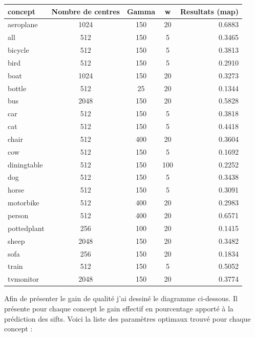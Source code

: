 \documentclass[a4paper, 11pt]{article}
\begin{document}
\begin{center}
\begin{tabular}{|l|c|c|c|r|}
  \hline
  concept & Nombre de centres & Gamma & w & Resultats (map) \\
  \hline
	aeroplane&1024&150 & 20 & 0.6883\\  \hline
	all&512&150 & 5 & 0.3465\\  \hline
	bicycle&512&150 & 5 & 0.3813\\  \hline
	bird&512&150 & 5 & 0.2910\\  \hline
	boat&1024&150 & 20 & 0.3273\\  \hline
	bottle&512&25 & 20 & 0.1344\\  \hline
	bus&2048&150 & 20 & 0.5828\\  \hline
	car&512&150 & 5 & 0.3818\\  \hline
	cat&512&150 & 5 & 0.4418\\  \hline
	chair&512&400 & 20 & 0.3604\\  \hline
	cow&512&150 & 5 & 0.1692\\  \hline
	diningtable&512&150 & 100 & 0.2252\\  \hline
	dog&512&150 & 5 & 0.3438\\  \hline
	horse&512&150 & 5 & 0.3091\\  \hline
	motorbike&512&400 & 20 & 0.2983\\  \hline
	person&512&400 & 20 & 0.6571\\  \hline
	pottedplant&256&100 & 20 & 0.1415\\  \hline
	sheep&2048&150 & 20 & 0.3482\\  \hline
	sofa&256&150 & 20 & 0.1834\\  \hline
	train&512&150 & 5 & 0.5052\\  \hline
	tvmonitor&2048&150 & 20 & 0.3774 \\
   \hline
\end{tabular}
\end{center}

Afin de présenter le gain de qualité j'ai dessiné le diagramme ci-dessous. Il présente pour chaque concept le gain effectif en pourcentage apporté à la prédiction des sifts.
Voici la liste des paramètres optimaux trouvé pour chaque concept :
\end{document}
